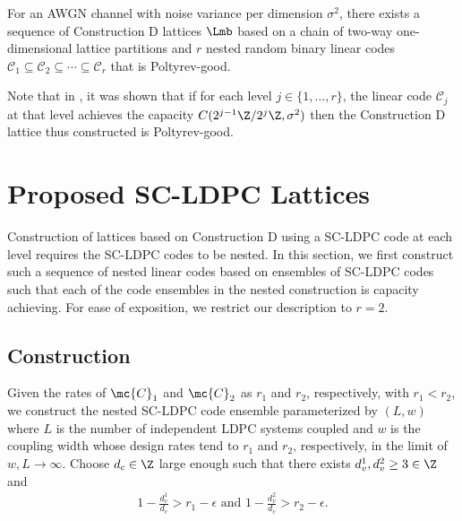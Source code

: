 \documentclass[conference]{IEEEtran}
\begin{document}
\begin{theorem}
For an AWGN channel with noise variance per dimension $\sigma^{2}$, there exists a sequence of Construction D lattices $\Lmb$ based on a chain of two-way one-dimensional lattice partitions and $r$ nested random binary linear codes $\mathcal{C}_{1}\subseteq \mathcal{C}_{2}\subseteq\cdots \subseteq \mathcal{C}_{r}$ that is Poltyrev-good.
\end{theorem}
\begin{remark}\label{rmk:Forney_proof}
    Note that in \cite{forney2000}, it was shown that if for each level $j\in\{1,\ldots,r\}$, the linear code $\mathcal{C}_{j}$ at that level achieves the capacity $C(2^{j-1}\Z/2^{j}\Z,\sigma^{2})$ then the Construction
    D lattice thus constructed is Poltyrev-good.
\end{remark}

\section{Proposed SC-LDPC Lattices}\label{Sec:SCLDPC}

Construction of lattices based on Construction D using a SC-LDPC code at each level requires the SC-LDPC codes to be nested. In this section, we first construct such a sequence of nested linear codes based on ensembles of SC-LDPC codes such that each of the code ensembles in the nested construction is capacity achieving. For ease of exposition, we restrict our description to $r=2$.
%

\subsection{Construction}
Given the rates of $\mc{C}_1$ and $\mc{C}_2$ as $r_{1}$ and $r_{2}$, respectively, with $r_{1}<r_{2}$, we construct
the nested SC-LDPC code ensemble parameterized by $(L,w)$ where $L$ is the
number of independent LDPC systems coupled and $w$ is the coupling width whose design rates tend to $r_{1}$ and $r_{2}$, respectively,
 in the limit of $w,L\rightarrow \infty$. Choose $d_{c}\in\Z$ large enough such that there exists $d_{v}^{1},d_{v}^{2}\geq 3\in\Z$ and
\begin{align*}
    1-\frac{d_{v}^{1}}{d_{c}}>r_{1}-\epsilon\text{  and } 1-\frac{d_{v}^{2}}{d_{c}}>r_{2}-\epsilon.
\end{align*}
\end{document}
